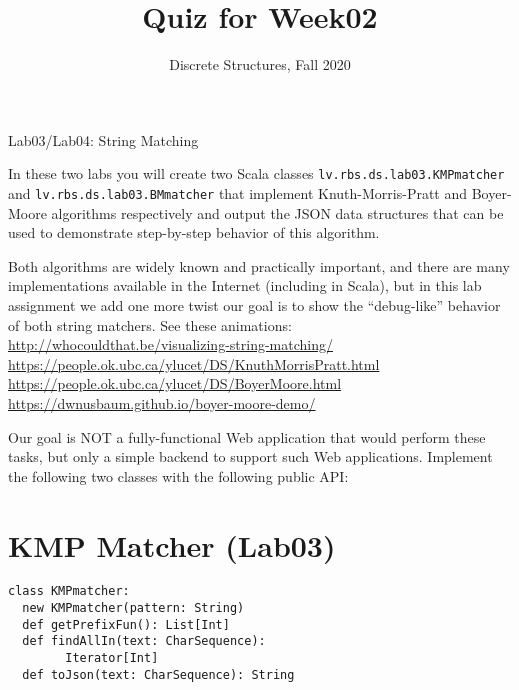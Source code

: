 \documentclass[jou]{apa6}
\title{Quiz for Week02}
\author{Discrete Structures, Fall 2020}
\affiliation{RBS}
\begin{document}

\twocolumn
{\Large Lab03/Lab04: String Matching}

\thispagestyle{empty}

In these two labs you will create two Scala classes {\tt lv.rbs.ds.lab03.KMPmatcher}
and {\tt lv.rbs.ds.lab03.BMmatcher} that implement Knuth-Morris-Pratt and 
Boyer-Moore algorithms respectively and output the JSON data structures
that can be used to demonstrate step-by-step behavior of this algorithm. 

Both algorithms are widely known and practically important, and there are many implementations available
in the Internet (including in Scala), but in this lab assignment we add 
one more twist \textendash{} our goal is to show the ``debug-like'' behavior of 
both string matchers. See these animations:\\ {\footnotesize
\url{http://whocouldthat.be/visualizing-string-matching/}\\
\url{https://people.ok.ubc.ca/ylucet/DS/KnuthMorrisPratt.html}\\
\url{https://people.ok.ubc.ca/ylucet/DS/BoyerMoore.html}\\
\url{https://dwnusbaum.github.io/boyer-moore-demo/} }

Our goal is NOT a fully-functional Web application
that would perform these tasks, but only a simple backend to support such Web applications. 
Implement the following two classes with the following public API: 

\section{KMP Matcher (Lab03)}

\begin{verbatim}
class KMPmatcher:
  new KMPmatcher(pattern: String)
  def getPrefixFun(): List[Int]
  def findAllIn(text: CharSequence): 
        Iterator[Int]
  def toJson(text: CharSequence): String
\end{verbatim}
\end{document}
